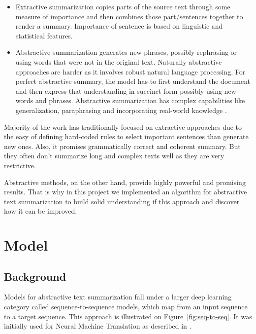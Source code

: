 \begin{itemize}
	\item Extractive summarization copies parts of the source text through some measure of importance and then combines those part/sentences together to render a summary. Importance of sentence is based on linguistic and statistical features.

	\item Abstractive summarization generates new phrases, possibly rephrasing or using words that were not in the original text. Naturally abstractive approaches are harder as it involves robust natural language processing. For perfect abstractive summary, the model has to first understand the document and then express that understanding in succinct form possibly using new words and phrases.  Abstractive summarization has complex capabilities like generalization, paraphrasing and incorporating  real-world knowledge \cite{abstractive_text_summarization}.
\end{itemize}

Majority of the work has traditionally focused on extractive approaches due to the easy of defining hard-coded rules to select important sentences than generate new ones. Also, it promises grammatically correct and coherent summary. But they often don’t summarize long and complex texts well as they are very restrictive.


Abstractive methods, on the other hand, provide highly powerful and promising results. That is why in this project we implemented an algorithm for abstractive text summarization to build solid understanding if this approach and discover how it can be improved.


\section{Model}
\subsection{Background}
Models for abstractive text summarization fall under a larger deep learning category called
sequence-to-sequence models, which map from an input sequence to a target sequence. This approach is illustrated on Figure~\ref{fig:seq-to-seq}. It was initially used for Neural Machine Translation as described in \cite{attention_based_NMT}. 


